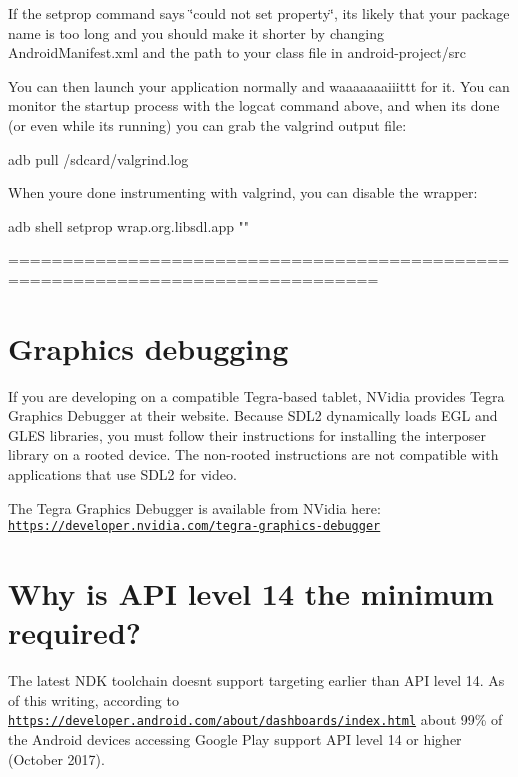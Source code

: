 If the setprop command says \char`\"{}could not set property\char`\"{}, it\textquotesingle{}s likely that your package name is too long and you should make it shorter by changing Android\+Manifest.\+xml and the path to your class file in android-\/project/src

You can then launch your application normally and waaaaaaaiiittt for it. You can monitor the startup process with the logcat command above, and when it\textquotesingle{}s done (or even while it\textquotesingle{}s running) you can grab the valgrind output file\+: \begin{DoxyVerb}adb pull /sdcard/valgrind.log
\end{DoxyVerb}


When you\textquotesingle{}re done instrumenting with valgrind, you can disable the wrapper\+: \begin{DoxyVerb}adb shell setprop wrap.org.libsdl.app ""
\end{DoxyVerb}


================================================================================ \section*{Graphics debugging }

If you are developing on a compatible Tegra-\/based tablet, N\+Vidia provides Tegra Graphics Debugger at their website. Because S\+D\+L2 dynamically loads E\+GL and G\+L\+ES libraries, you must follow their instructions for installing the interposer library on a rooted device. The non-\/rooted instructions are not compatible with applications that use S\+D\+L2 for video.

The Tegra Graphics Debugger is available from N\+Vidia here\+: \href{https://developer.nvidia.com/tegra-graphics-debugger}{\tt https\+://developer.\+nvidia.\+com/tegra-\/graphics-\/debugger}



 \section*{Why is A\+PI level 14 the minimum required? }

The latest N\+DK toolchain doesn\textquotesingle{}t support targeting earlier than A\+PI level 14. As of this writing, according to \href{https://developer.android.com/about/dashboards/index.html}{\tt https\+://developer.\+android.\+com/about/dashboards/index.\+html} about 99\% of the Android devices accessing Google Play support A\+PI level 14 or higher (October 2017).



